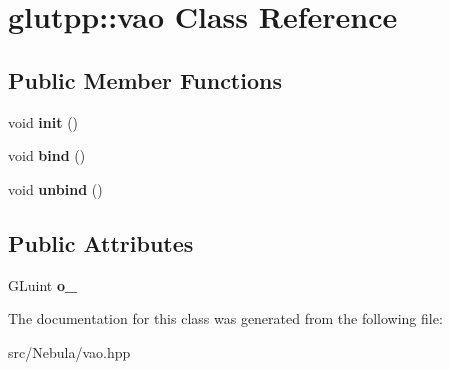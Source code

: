 \hypertarget{classglutpp_1_1vao}{\section{glutpp\-:\-:vao \-Class \-Reference}
\label{classglutpp_1_1vao}
}
\subsection*{\-Public \-Member \-Functions}
\begin{DoxyCompactItemize}
\item 
\hypertarget{classglutpp_1_1vao_a8ef0f944ab05f251bb7c2b9c938a32b6}{void {\bfseries init} ()}\label{classglutpp_1_1vao_a8ef0f944ab05f251bb7c2b9c938a32b6}

\item 
\hypertarget{classglutpp_1_1vao_ad162a38b7f0e9749bd6a6c917db70c0c}{void {\bfseries bind} ()}\label{classglutpp_1_1vao_ad162a38b7f0e9749bd6a6c917db70c0c}

\item 
\hypertarget{classglutpp_1_1vao_a2982afed99f8a8bc13ccd27b73f6121d}{void {\bfseries unbind} ()}\label{classglutpp_1_1vao_a2982afed99f8a8bc13ccd27b73f6121d}

\end{DoxyCompactItemize}
\subsection*{\-Public \-Attributes}
\begin{DoxyCompactItemize}
\item 
\hypertarget{classglutpp_1_1vao_a8b6c13fec6c3ecae720c6a3e54560a8d}{\-G\-Luint {\bfseries o\-\_\-}}\label{classglutpp_1_1vao_a8b6c13fec6c3ecae720c6a3e54560a8d}

\end{DoxyCompactItemize}


\-The documentation for this class was generated from the following file\-:\begin{DoxyCompactItemize}
\item 
src/\-Nebula/vao.\-hpp\end{DoxyCompactItemize}
